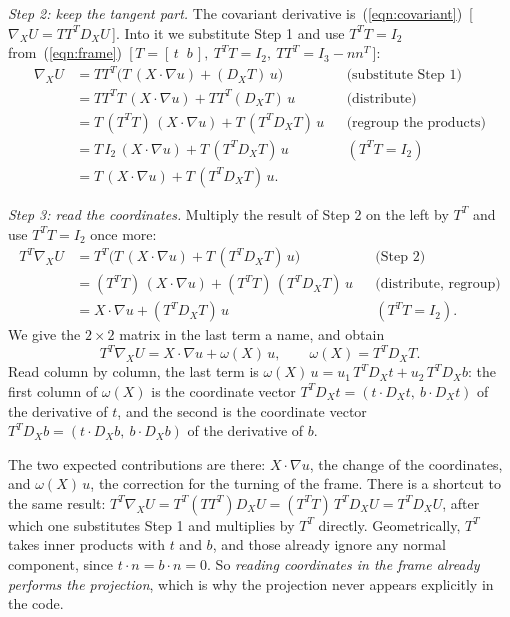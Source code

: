 \emph{Step 2: keep the tangent part.} The covariant derivative is~(\ref{eqn:covariant})~[\,$\nabla_X U = TT^TD_XU$\,]. Into it we substitute Step 1 and use $T^T T = I_2$ from~(\ref{eqn:frame})~[\,$T = [\,t\;\;b\,],\ T^TT = I_2,\ TT^T = I_3 - nn^T$\,]:
\begin{align*}
\nabla_X U &= T T^T \big( T\,(X\cdot\nabla u) + (D_X T)\, u \big) && \text{(substitute Step 1)} \\
&= T T^T T\,(X\cdot\nabla u) + T T^T (D_X T)\, u && \text{(distribute)} \\
&= T\,(T^T T)\,(X\cdot\nabla u) + T\,(T^T D_X T)\, u && \text{(regroup the products)} \\
&= T\, I_2\,(X\cdot\nabla u) + T\,(T^T D_X T)\, u && (T^TT = I_2) \\
&= T\,(X\cdot\nabla u) + T\,(T^T D_X T)\, u .
\end{align*}

\emph{Step 3: read the coordinates.} Multiply the result of Step 2 on the left by $T^T$ and use $T^T T = I_2$ once more:
\begin{align*}
T^T \nabla_X U &= T^T \big( T\,(X\cdot\nabla u) + T\,(T^T D_X T)\, u \big) && \text{(Step 2)} \\
&= (T^T T)\,(X\cdot\nabla u) + (T^T T)\,(T^T D_X T)\, u && \text{(distribute, regroup)} \\
&= X\cdot\nabla u + (T^T D_X T)\, u && (T^TT = I_2).
\end{align*}
We give the $2\times 2$ matrix in the last term a name, and obtain
\begin{equation}
\label{eqn:covariant_frame}
T^T \nabla_X U = X \cdot \nabla u + \omega(X)\, u, \qquad \omega(X) = T^T D_X T .
\end{equation}
Read column by column, the last term is $\omega(X)\,u = u_1\, T^T D_X t + u_2\, T^T D_X b$: the first column of $\omega(X)$ is the coordinate vector $T^T D_X t = (t\cdot D_X t,\ b\cdot D_X t)$ of the derivative of $t$, and the second is the coordinate vector $T^T D_X b = (t\cdot D_X b,\ b\cdot D_X b)$ of the derivative of $b$.

The two expected contributions are there: $X\cdot\nabla u$, the change of the coordinates, and $\omega(X)\,u$, the correction for the turning of the frame. There is a shortcut to the same result: $T^T \nabla_X U = T^T (T T^T) D_X U = (T^T T)\, T^T D_X U = T^T D_X U$, after which one substitutes Step 1 and multiplies by $T^T$ directly. Geometrically, $T^T$ takes inner products with $t$ and $b$, and those already ignore any normal component, since $t \cdot n = b \cdot n = 0$. So \emph{reading coordinates in the frame already performs the projection}, which is why the projection never appears explicitly in the code.

